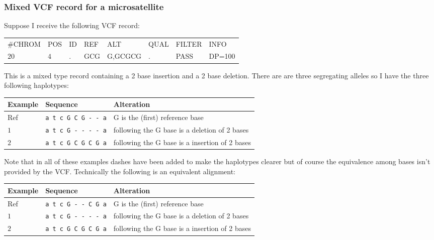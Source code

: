 \documentclass[8pt]{article}
\begin{document}
\subsubsection{Mixed VCF record for a microsatellite}
Suppose I receive the following VCF record:

\vspace{0.3cm}
\begin{tabular}{ l l l l l l l l}
	\#CHROM & POS & ID & REF & ALT & QUAL & FILTER & INFO \\
	$20$ & $4$ & . & GCG & G,GCGCG & . & PASS & DP=100 \\
\end{tabular}
\vspace{0.3cm}

This is a mixed type record containing a 2 base insertion and a 2 base deletion. There are are three segregating alleles so I have the three following haplotypes:

\vspace{0.3cm}
\begin{tabular}{ | l | l | l | }
\hline
Example & Sequence & Alteration \\ \hline
Ref & \verb|a t c G C G - - a| & G is the (first) reference base \\ \hline
$1$ & \verb|a t c G - - - - a| & following the G base is a deletion of 2 bases \\ \hline
$2$ & \verb|a t c G C G C G a| & following the G base is a insertion of 2 bases \\ \hline
\end{tabular}
\vspace{0.3cm}

Note that in all of these examples dashes have been added to make the haplotypes clearer but of course the equivalence among bases isn't provided by the VCF. Technically the following is an equivalent alignment:

\vspace{0.3cm}
\begin{tabular}{ | l | l | l | }
\hline
Example & Sequence & Alteration \\ \hline
Ref & \verb|a t c G - - C G a| & G is the (first) reference base \\ \hline
$1$ & \verb|a t c G - - - - a| & following the G base is a deletion of 2 bases \\ \hline
$2$ & \verb|a t c G C G C G a| & following the G base is a insertion of 2 bases \\ \hline
\end{tabular}
\end{document}
